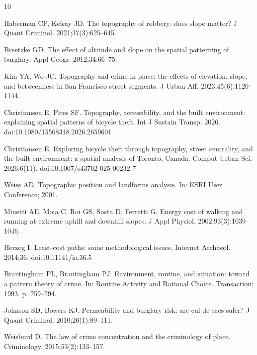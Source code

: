 \documentclass[10pt,letterpaper]{article}
\begin{document}
\begin{thebibliography}{10}

Haberman CP, Kelsay JD.
\newblock The topography of robbery: does slope matter?
\newblock J Quant Criminol. 2021;37(3):625--645.

Breetzke GD.
\newblock The effect of altitude and slope on the spatial patterning of burglary.
\newblock Appl Geogr. 2012;34:66--75.

Kim YA, Wo JC.
\newblock Topography and crime in place: the effects of elevation, slope, and
betweenness in San Francisco street segments.
\newblock J Urban Aff. 2023;45(6):1120--1144.

Christiansen E, Pires SF.
\newblock Topography, accessibility, and the built environment: explaining spatial
patterns of bicycle theft.
\newblock Int J Sustain Transp. 2026.
\newblock doi:10.1080/15568318.2026.2659601

Christiansen E.
\newblock Exploring bicycle theft through topography, street centrality, and the
built environment: a spatial analysis of Toronto, Canada.
\newblock Comput Urban Sci. 2026;6(11).
\newblock doi:10.1007/s43762-025-00232-7

Weiss AD.
\newblock Topographic position and landforms analysis.
\newblock In: ESRI User Conference; 2001.

Minetti AE, Moia C, Roi GS, Susta D, Ferretti G.
\newblock Energy cost of walking and running at extreme uphill and downhill slopes.
\newblock J Appl Physiol. 2002;93(3):1039--1046.

Herzog I.
\newblock Least-cost paths: some methodological issues.
\newblock Internet Archaeol. 2014;36.
\newblock doi:10.11141/ia.36.5

Brantingham PL, Brantingham PJ.
\newblock Environment, routine, and situation: toward a pattern theory of crime.
\newblock In: Routine Activity and Rational Choice. Transaction; 1993. p. 259--294.

Johnson SD, Bowers KJ.
\newblock Permeability and burglary risk: are cul-de-sacs safer?
\newblock J Quant Criminol. 2010;26(1):89--111.

Weisburd D.
\newblock The law of crime concentration and the criminology of place.
\newblock Criminology. 2015;53(2):133--157.


\end{thebibliography}
\end{document}
